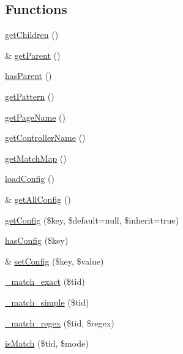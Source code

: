 \subsection*{Functions}
\begin{DoxyCompactItemize}
\item 
\hyperlink{namespaceWEPPO_1_1Routing_a1d53296d0e2c843dde991a73ed41711d}{get\+Children} ()
\item 
\& \hyperlink{namespaceWEPPO_1_1Routing_ac2da3532fbf1139b4450e829d51267dc}{get\+Parent} ()
\item 
\hyperlink{namespaceWEPPO_1_1Routing_aa7b2f9fd1cde80e31d0c05b7cb120036}{has\+Parent} ()
\item 
\hyperlink{namespaceWEPPO_1_1Routing_aca97d433a3fbefc33376a9e1518ad828}{get\+Pattern} ()
\item 
\hyperlink{namespaceWEPPO_1_1Routing_aa5f3adb2a95328e74c47f5d3727cbf01}{get\+Page\+Name} ()
\item 
\hyperlink{namespaceWEPPO_1_1Routing_a9be5aa06acfa27abba6249ac9df81eee}{get\+Controller\+Name} ()
\item 
\hyperlink{namespaceWEPPO_1_1Routing_a34ff57f89f3c46907a35341eeac2833d}{get\+Match\+Map} ()
\item 
\hyperlink{namespaceWEPPO_1_1Routing_a873a0da3c9f234cad91c1f99015ff0d0}{load\+Config} ()
\item 
\& \hyperlink{namespaceWEPPO_1_1Routing_a51c1dccb266d89994bfe234040ae7a86}{get\+All\+Config} ()
\item 
\hyperlink{namespaceWEPPO_1_1Routing_a8b3515ee64b7cb3fd4c52a1720dd1587}{get\+Config} (\$key, \$default=null, \$inherit=true)
\item 
\hyperlink{namespaceWEPPO_1_1Routing_a87af3e5ddeccb4a92e80faab4d7c4397}{has\+Config} (\$key)
\item 
\& \hyperlink{namespaceWEPPO_1_1Routing_a8cfa1bbccd30c7902723a5991d82b82c}{set\+Config} (\$key, \$value)
\item 
\hyperlink{namespaceWEPPO_1_1Routing_a98cfbc2c13f28e74275ed055a1b9499a}{\+\_\+match\+\_\+exact} (\$tid)
\item 
\hyperlink{namespaceWEPPO_1_1Routing_a37c8c9d113c753a86c3710977e76b524}{\+\_\+match\+\_\+simple} (\$tid)
\item 
\hyperlink{namespaceWEPPO_1_1Routing_a5f697e4b8a381911ae15ffc52aa1dba5}{\+\_\+match\+\_\+regex} (\$tid, \$regex)
\item 
\hyperlink{namespaceWEPPO_1_1Routing_a5a31986f7006de86d7ce6acd824f7f46}{is\+Match} (\$tid, \$mode)
\item 

\end{DoxyCompactItemize}
